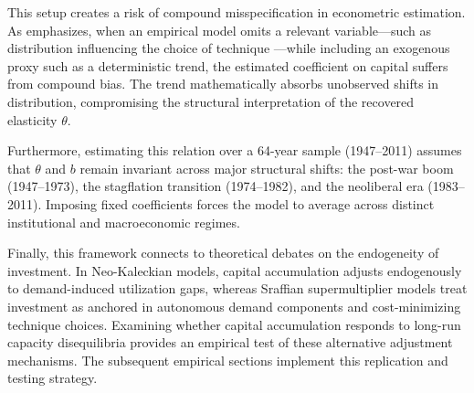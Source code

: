 This setup creates a risk of compound misspecification in econometric estimation. As \citet{Basu2020} emphasizes, when an empirical model omits a relevant variable---such as distribution influencing the choice of technique \citep{Kurz1986}---while including an exogenous proxy such as a deterministic trend, the estimated coefficient on capital suffers from compound bias. The trend mathematically absorbs unobserved shifts in distribution, compromising the structural interpretation of the recovered elasticity $\theta$.

Furthermore, estimating this relation over a 64-year sample (1947--2011) assumes that $\theta$ and $b$ remain invariant across major structural shifts: the post-war boom (1947--1973), the stagflation transition (1974--1982), and the neoliberal era (1983--2011). Imposing fixed coefficients forces the model to average across distinct institutional and macroeconomic regimes.

Finally, this framework connects to theoretical debates on the endogeneity of investment. In Neo-Kaleckian models, capital accumulation adjusts endogenously to demand-induced utilization gaps, whereas Sraffian supermultiplier models treat investment as anchored in autonomous demand components and cost-minimizing technique choices. Examining whether capital accumulation responds to long-run capacity disequilibria provides an empirical test of these alternative adjustment mechanisms. The subsequent empirical sections implement this replication and testing strategy.
